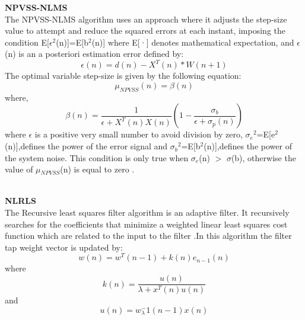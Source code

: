 \documentclass[10pt,twocolumn]{witseiepaper}
\begin{document}
\textbf{NPVSS-NLMS} \hfill\\
The NPVSS-NLMS algorithm uses an approach where it adjusts the step-size value to attempt and reduce the squared errors at each instant, imposing the condition E[$\epsilon$$^2$(n)]=E[b$^2$(n)] where E[·] denotes mathematical expectation, and $\epsilon$(n) is an a posteriori estimation error defined by:
\begin{equation}\label{my_first_eqn}
\epsilon(n)=d(n)-X^T(n)*W(n+1)
\end{equation}
The optimal variable step-size is given by the following equation:
\begin{equation}\label{my_first_eqn}
\mu_{NPVSS}(n)=\beta(n)
\end{equation}
where,
\begin{equation}\label{my_first_eqn}
\beta(n)=\frac{1}{\epsilon+X^T(n)X(n)}(1-\frac{\sigma_b}{\epsilon+\sigma_p(n)})
\end{equation}
where $\epsilon$ is a positive very small number to avoid division by zero, $\sigma$$_e$$^2$=E[e$^2$(n)],defines the power of the error
signal and $\sigma$$_b$$^2$=E[b$^2$(n)],defines the power of the system noise.
This condition is only true when $\sigma$$_e$(n) $>$ $\sigma$(b), otherwise the value of $\mu$$_{NPVSS}$(n) is equal to zero \cite{echo}.

\hfill\\
\textbf{NLRLS} \hfill\\
The Recursive least squares filter algorithm is an adaptive filter. It recursively searches for the coefficients that minimize a weighted linear least squares cost function which are related to the input to the filter \cite{RLS}.In this algorithm the filter tap weight vector is updated by:
\begin{equation}\label{my_first_eqn}
w(n)=w^T(n-1)+k(n)e_{n-1}(n)
\end{equation}
where 
\begin{equation}\label{my_first_eqn}
k(n)=\frac{u(n)}{\lambda+x^T(n)u(n)}
\end{equation}
and 
\begin{equation}\label{my_first_eqn}
u(n)=w_\lambda^-1(n-1)x(n)
\end{equation}
\end{document}
